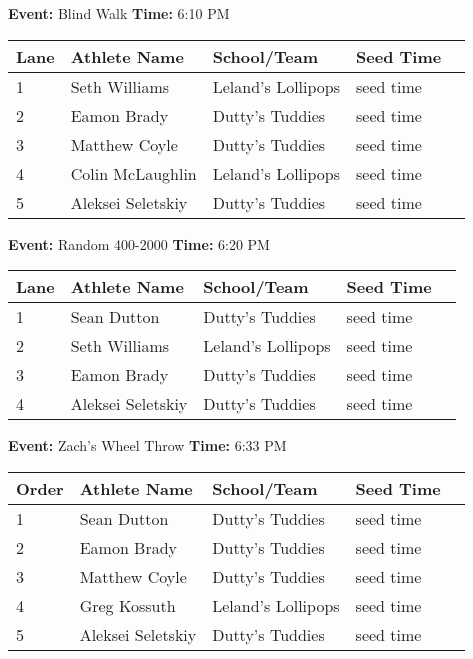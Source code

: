 \documentclass[11pt]{article}
\begin{document}
\textbf{Event:} Blind Walk \quad \textbf{Time:} 6:10 PM 

\vspace{1em}
\begin{tabular}{@{}lllll@{}}
\toprule

\textbf{Lane} & \textbf{Athlete Name} & \textbf{School/Team} & \textbf{Seed Time} \\
\midrule
1 & Seth Williams & Leland's Lollipops & seed time &\\
2 & Eamon Brady & Dutty's Tuddies & seed time &\\
3 & Matthew Coyle & Dutty's Tuddies & seed time &\\
4 & Colin McLaughlin & Leland's Lollipops & seed time &\\
5 & Aleksei Seletskiy & Dutty's Tuddies & seed time &\\
\bottomrule
\end{tabular}
\vspace{2.5em}


\textbf{Event:} Random 400-2000 \quad \textbf{Time:} 6:20 PM 

\vspace{1em}
\begin{tabular}{@{}lllll@{}}
\toprule

\textbf{Lane} & \textbf{Athlete Name} & \textbf{School/Team} & \textbf{Seed Time} \\
\midrule
1 & Sean Dutton & Dutty's Tuddies & seed time &\\
2 & Seth Williams & Leland's Lollipops & seed time &\\
3 & Eamon Brady & Dutty's Tuddies & seed time &\\
4 & Aleksei Seletskiy & Dutty's Tuddies & seed time &\\
\bottomrule
\end{tabular}
\vspace{2.5em}


\textbf{Event:} Zach's Wheel Throw \quad \textbf{Time:} 6:33 PM 

\vspace{1em}
\begin{tabular}{@{}lllll@{}}
\toprule

\textbf{Order} & \textbf{Athlete Name} & \textbf{School/Team} & \textbf{Seed Time} \\
\midrule
1 & Sean Dutton & Dutty's Tuddies & seed time &\\
2 & Eamon Brady & Dutty's Tuddies & seed time &\\
3 & Matthew Coyle & Dutty's Tuddies & seed time &\\
4 & Greg Kossuth & Leland's Lollipops & seed time &\\
5 & Aleksei Seletskiy & Dutty's Tuddies & seed time &\\
\bottomrule
\end{tabular}
\vspace{2.5em}
\end{document}
